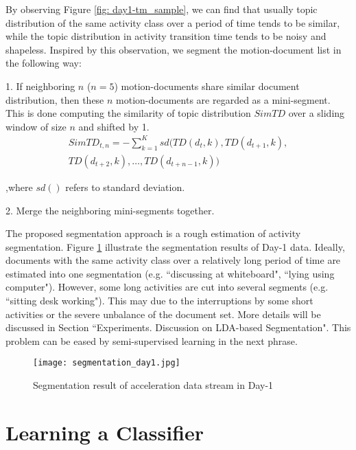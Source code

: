 \documentclass{sigchi}
\begin{document}
     By observing Figure \ref{fig: day1-tm_sample}, we can find that usually topic distribution of the same activity class over a period of time tends to be similar, while the topic distribution in activity transition time tends to be noisy and shapeless.
     Inspired by this observation, we segment the motion-document list in the following way:

    1. If neighboring $n$ ($n=5$) motion-documents share similar document distribution, then these $n$ motion-documents are regarded as a mini-segment.
    This is done computing the similarity of topic distribution $SimTD$ over a sliding window of size $n$ and shifted by 1.
        \begin{equation}
            \begin{split}
             SimTD_{t,n} = -\sum_{k=1}^K sd(TD(d_t, k), TD(d_{t+1}, k),  \\ TD(d_{t+2}, k), \ldots,
              TD(d_{t+n-1}, k))
            \end{split}
        \end{equation}

        ,where $sd()$ refers to standard deviation.

    2. Merge the neighboring mini-segments together.

    The proposed segmentation approach is a rough estimation of activity segmentation.
    Figure \ref{fig: day1-segmentation-result} illustrate the segmentation results of Day-1 data.
    Ideally, documents with the same activity class over a relatively long period of time are estimated into one segmentation (e.g. ``discussing at whiteboard", ``lying using computer").
    However, some long activities are cut into several segments (e.g. ``sitting desk working").
    This may due to the interruptions by some short activities or the severe unbalance of the document set.
    More details will be discussed in Section ``Experiments. Discussion on LDA-based Segmentation".
    This problem can be eased by semi-supervised learning in the next phrase.

    \begin{figure}
        \centering
        \texttt{[image: segmentation\_day1.jpg]}
        \caption{Segmentation result of acceleration data stream in Day-1}
        \label{fig: day1-segmentation-result}
    \end{figure}


\section{Learning a Classifier}
\label{sec.learn-a-classifier}
\end{document}
